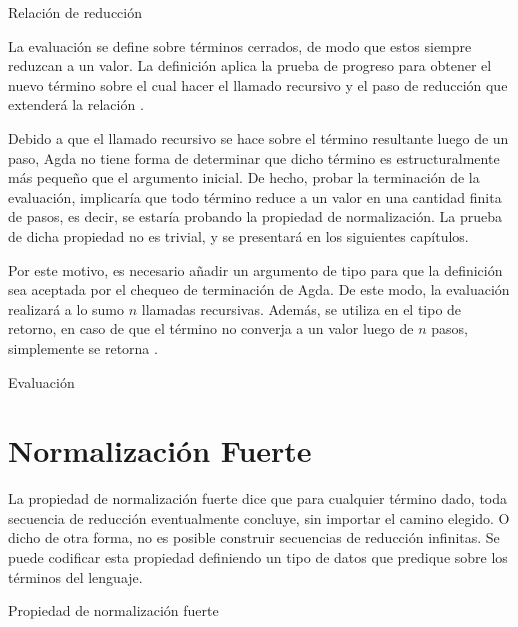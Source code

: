\begin{codigo}
	Relación de reducción
\end{codigo}

La evaluación se define sobre términos cerrados, de modo que estos siempre reduzcan a un valor.
La definición aplica la prueba de progreso para obtener el nuevo término sobre el cual hacer el llamado recursivo y el paso de reducción que extenderá la relación \type{$\_\rightsquigarrow\_$}.

Debido a que el llamado recursivo se hace sobre el término resultante luego de un paso, Agda no tiene forma de determinar que dicho término es estructuralmente más pequeño que el argumento inicial.
De hecho, probar la terminación de la evaluación, implicaría que todo término reduce a un valor en una cantidad finita de pasos, es decir, se estaría probando la propiedad de normalización.
La prueba de dicha propiedad no es trivial, y se presentará en los siguientes capítulos.

Por este motivo, es necesario añadir un argumento de tipo  para que la definición sea aceptada por el chequeo de terminación de Agda.
De este modo, la evaluación realizará a lo sumo $n$ llamadas recursivas.
Además, se utiliza  en el tipo de retorno, en caso de que el término no converja a un valor luego de $n$ pasos, simplemente se retorna .


\begin{codigo}
	Evaluación
\end{codigo}


\section{Normalización Fuerte}

La propiedad de normalización fuerte dice que para cualquier término dado, toda secuencia de reducción eventualmente concluye, sin importar el camino elegido.
O dicho de otra forma, no es posible construir secuencias de reducción infinitas.
Se puede codificar esta propiedad definiendo un tipo de datos que predique sobre los términos del lenguaje.

\begin{codigo}
	Propiedad de normalización fuerte
\end{codigo}

